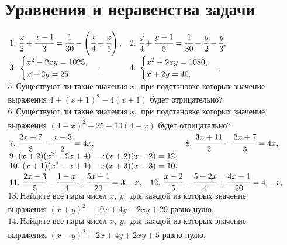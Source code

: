 \section{Уравнения и неравенства задачи}
$\begin{array}{ll}
1.\ \cfrac{x}{2}+\cfrac{x-1}{3}=\cfrac{1}{30}-\left(\cfrac{x}{4}+\cfrac{x}{5}\right),&
2.\ \cfrac{y}{4}+\cfrac{y-1}{5}=\cfrac{1}{30}-\cfrac{y}{2}-\cfrac{y}{3},\\
3.\ \begin{cases} x^2-2xy=1025,\\x-2y=25.\end{cases},&
4.\ \begin{cases} x^2+2xy=1080,\\x+2y=40.\end{cases},\end{array}$\\
$\begin{array}{l}
5.\ \text{Существуют ли такие значения }x,\text{ при подстановке которых значение}\\
\text{выражения }4+(x+1)^2-4(x+1)\text{ будет отрицательно?}\\
6.\ \text{Существуют ли такие значения }x,\text{ при подстановке которых значение}\\
\text{выражения }(4-x)^2+25-10(4-x)\text{ будет отрицательно?}
\end{array}$\\
$\begin{array}{ll}
7.\ \cfrac{2x+7}{3}-\cfrac{x-3}{2}=4x,&
8.\ \cfrac{3x+11}{2}-\cfrac{2x+7}{3}=4x,\\
9.\ (x+2)(x^2-2x+4)-x(x+2)(x-2)=12,\\
10.\ (x+1)(x^2-x+1)-x(x+3)(x-3)=10,\end{array}$\\
$\begin{array}{ll}11.\ \cfrac{2x-3}{5}-\cfrac{1-x}{4}+\cfrac{5x+1}{20}=3-x,&
12.\ \cfrac{x-2}{5}-\cfrac{5-2x}{4}+\cfrac{4x-1}{20}=4-x,
\end{array}$\\
$\begin{array}{l}
13.\ \text{Найдите все пары чисел }x,\ y, \text{ для каждой из которых значение}\\
\text{выражения }(x+y)^2-10x+4y-2xy+29\text{ равно нулю,}\\
14.\ \text{Найдите все пары чисел }x,\ y, \text{ для каждой из которых значение}\\
\text{выражения }(x-y)^2+2x+4y+2xy+5\text{ равно нулю,}
\end{array}$\\
